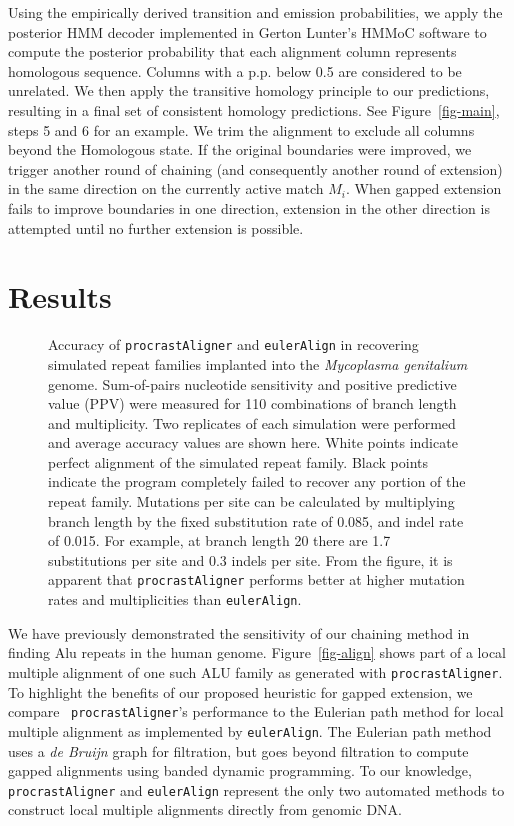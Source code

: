 \documentclass{ws-procs975x65}
\begin{document}
Using the empirically derived transition and emission probabilities,
we apply the posterior HMM decoder implemented in Gerton Lunter's
HMMoC software\cite{hmmoc} to compute the posterior probability that
each alignment column represents homologous sequence.  Columns with a
p.p. below 0.5 are considered to be unrelated.  We then apply the
transitive homology principle to our predictions, resulting in a final
set of consistent homology predictions.  See Figure~\ref{fig-main},
steps 5 and 6 for an example. We trim the alignment to exclude all
columns beyond the Homologous state. If the original boundaries were
improved, we trigger another round of chaining (and consequently
another round of extension) in the same direction on the currently
active match $M_i$.  When gapped extension fails to improve boundaries
in one direction, extension in the other direction is attempted until
no further extension is possible.


\section{Results}
\begin{figure}[t]
\centering {}
\caption{Accuracy of \texttt{procrastAligner} and \texttt{eulerAlign} in
recovering simulated repeat families implanted into the
\textit{Mycoplasma genitalium} genome.  Sum-of-pairs nucleotide
sensitivity and positive predictive value (PPV) were measured for 110
combinations of branch length and multiplicity.  Two replicates of
each simulation were performed and average accuracy values are shown
here.  White points indicate perfect alignment of the simulated repeat
family.  Black points indicate the program completely failed to
recover any portion of the repeat family.  Mutations per site can be
calculated by multiplying branch length by the fixed substitution rate
of 0.085, and indel rate of 0.015.  For example, at branch length 20
there are 1.7 substitutions per site and 0.3 indels per site.  From
the figure, it is apparent that \texttt{procrastAligner} performs better
at higher mutation rates and multiplicities than \texttt{eulerAlign}.}
\label{fig-results}\vspace{-0.2cm}
\end{figure}

We have previously demonstrated the sensitivity of our chaining method
in finding Alu repeats in the human
genome\cite{ref-procrast}. Figure~\ref{fig-align} shows part of a
local multiple alignment of one such ALU family as generated with
\texttt{procrastAligner}. To highlight the benefits of our proposed
heuristic for gapped extension, we compare ~\texttt{procrastAligner}'s
performance to the Eulerian path method for local multiple alignment
as implemented by \texttt{eulerAlign}\cite{ref-related1}. The Eulerian
path method uses a \textit{de Bruijn} graph for filtration, but goes
beyond filtration to compute gapped alignments using banded dynamic
programming.  To our knowledge, \texttt{procrastAligner} and
\texttt{eulerAlign} represent the only two automated methods to
construct local multiple alignments directly from genomic DNA.
\end{document}
